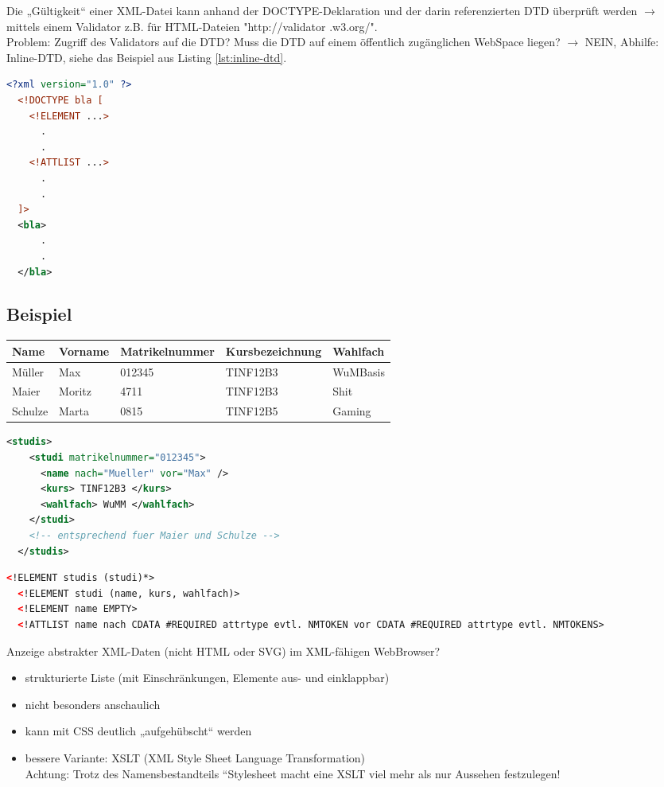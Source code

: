 \newpage
Die „Gültigkeit“ einer XML-Datei kann anhand der DOCTYPE-Deklaration und der darin referenzierten DTD überprüft werden $\rightarrow$ mittels einem Validator z.B. für HTML-Dateien "http://validator .w3.org/".\\
Problem: Zugriff des Validators auf die DTD? Muss die DTD auf einem öffentlich zugänglichen WebSpace liegen? $\rightarrow$ NEIN, Abhilfe: Inline-DTD, siehe das Beispiel aus Listing \vref{lst:inline-dtd}.
\begin{lstlisting}[caption={Inline-DTD Beispiel}, label={lst:inline-dtd}, language={XML}]
  <?xml version="1.0" ?>
  <!DOCTYPE bla [
    <!ELEMENT ...>
      .
      .
    <!ATTLIST ...>
      .
      .
  ]>
  <bla>
      .     
      .
  </bla> 
\end{lstlisting}

\newpage
\subsection{Beispiel}
\begin{tabularx}{\textwidth}{l|l|l|l|X}
\textbf{Name}	& \textbf{Vorname}	& \textbf{Matrikelnummer}	& \textbf{Kursbezeichnung}	& \textbf{Wahlfach}\\\hline
Müller	& Max		& 012345	& TINF12B3	& WuMBasis\\
Maier	& Moritz	& 4711		& TINF12B3	& Shit\\
Schulze	& Marta		& 0815		& TINF12B5	& Gaming\\
\end{tabularx}	

\begin{lstlisting}[caption={Listeneinträge}, label={lst:inline-dtd}, language={XML}]
  <studis>
    <studi matrikelnummer="012345">
      <name nach="Mueller" vor="Max" />
      <kurs> TINF12B3 </kurs>
      <wahlfach> WuMM </wahlfach>
    </studi>
    <!-- entsprechend fuer Maier und Schulze -->
  </studis>
\end{lstlisting}

\begin{lstlisting}[caption={Baumerstellung per !ELEMENT}, label={lst:inline-dtd}, language={XML}]
  <!ELEMENT studis (studi)*>
  <!ELEMENT studi (name, kurs, wahlfach)>
  <!ELEMENT name EMPTY>
  <!ATTLIST name nach CDATA #REQUIRED attrtype evtl. NMTOKEN vor CDATA #REQUIRED attrtype evtl. NMTOKENS>
\end{lstlisting}

Anzeige abstrakter XML-Daten (nicht HTML oder SVG) im XML-fähigen WebBrowser?
\begin{itemize}
\item strukturierte Liste (mit Einschränkungen, Elemente aus- und einklappbar)
\item nicht besonders anschaulich
\item kann mit CSS deutlich „aufgehübscht“ werden
\item bessere Variante: XSLT (XML Style Sheet Language Transformation)\\
Achtung: Trotz des Namensbestandteils “Stylesheet macht eine XSLT viel mehr als nur Aussehen festzulegen!
\end{itemize}
